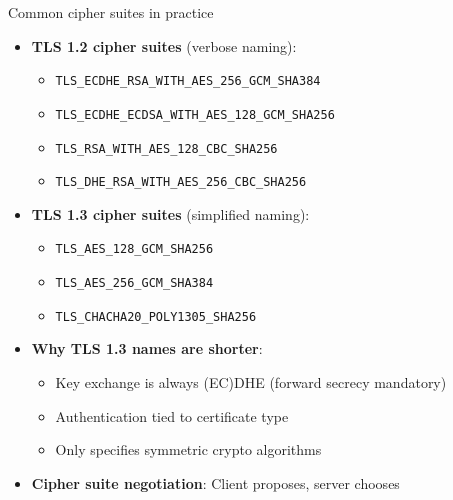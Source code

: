 \ifdefined\PRESENTATION\else\PassOptionsToClass{handout}{beamer}\fi\documentclass[aspectratio=169, lualatex]{beamer}
\begin{document}
\begin{frame}{Common cipher suites in practice}
	\begin{itemize}[<+->]
		\item \textbf{TLS 1.2 cipher suites} (verbose naming):
		      \begin{itemize}
			      \item \texttt{TLS\_ECDHE\_RSA\_WITH\_AES\_256\_GCM\_SHA384}
			      \item \texttt{TLS\_ECDHE\_ECDSA\_WITH\_AES\_128\_GCM\_SHA256}
			      \item \texttt{TLS\_RSA\_WITH\_AES\_128\_CBC\_SHA256}
			      \item \texttt{TLS\_DHE\_RSA\_WITH\_AES\_256\_CBC\_SHA256}
		      \end{itemize}
		\item \textbf{TLS 1.3 cipher suites} (simplified naming):
		      \begin{itemize}
			      \item \texttt{TLS\_AES\_128\_GCM\_SHA256}
			      \item \texttt{TLS\_AES\_256\_GCM\_SHA384}
			      \item \texttt{TLS\_CHACHA20\_POLY1305\_SHA256}
		      \end{itemize}
		\item \textbf{Why TLS 1.3 names are shorter}:
		      \begin{itemize}
			      \item Key exchange is always (EC)DHE (forward secrecy mandatory)
			      \item Authentication tied to certificate type
			      \item Only specifies symmetric crypto algorithms
		      \end{itemize}
		\item \textbf{Cipher suite negotiation}: Client proposes, server chooses
	\end{itemize}
\end{frame}
\end{document}
